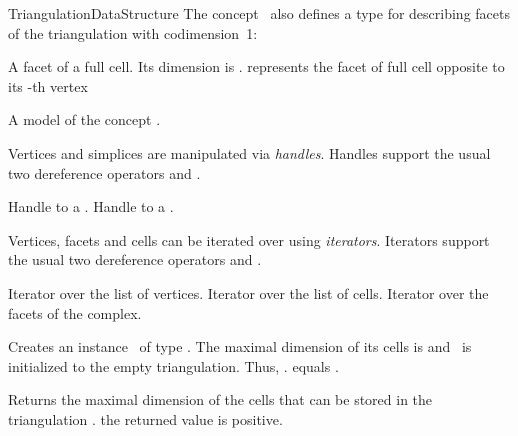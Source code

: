 \begin{ccRefConcept}{TriangulationDataStructure}
The concept \ccRefName\ also defines a type for describing facets of the
triangulation with codimension~1:

{A facet of a full cell. Its dimension is
.  represents the facet of
full cell  opposite to its -th vertex}

{A model of the concept .}

Vertices and simplices are manipulated via \emph{handles}. Handles support the
usual two dereference operators  and .

{
Handle to a .
}
\ccGlue
{}
{
Handle to a .
}

Vertices, facets and cells can be iterated over using \emph{iterators}.
Iterators support the usual two dereference operators  and
.

{
Iterator over the list of vertices.
}
\ccGlue
{}
{
Iterator over the list of cells.
}
\ccGlue
{}
{
Iterator over the facets of the complex.
}


\ccCreation
{}

 {Creates an instance \ccVar\ of
type \ccRefName. The maximal dimension of its cells is  and
\ccVar\ is initialized to the empty triangulation. Thus,
\ccVar. equals .}



 { Returns the maximal dimension of
the cells that can be stored in the triangulation \ccVar. \ccPostcond the
returned value is positive. }


\end{ccRefConcept}
